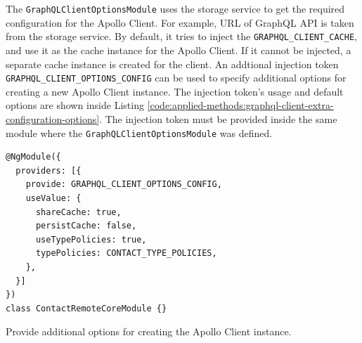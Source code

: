 \noindent The \texttt{GraphQLClientOptionsModule} uses the storage service to get the required configuration for the Apollo Client. For example, \ac{URL} of GraphQL \ac{API} is taken from the storage service. By default, it tries to inject the \texttt{GRAPHQL\_CLIENT\_CACHE}, and use it as the cache instance for the Apollo Client. If it cannot be injected, a separate cache instance is created for the client. An addtional injection token \texttt{GRAPHQL\_CLIENT\_OPTIONS\_CONFIG} can be used to specify additional options for creating a new Apollo Client instance. The injection token's usage and default options are shown inside Listing \ref{code:applied-methods:graphql-client-extra-configuration-options}. The injection token must be provided inside the same module where the \texttt{GraphQLClientOptionsModule} was defined.

\ifshowListings
\begin{listing}[H]
\begin{verbatim}
@NgModule({
  providers: [{
    provide: GRAPHQL_CLIENT_OPTIONS_CONFIG,
    useValue: {
      shareCache: true,
      persistCache: false,
      useTypePolicies: true,
      typePolicies: CONTACT_TYPE_POLICIES,
    },
  }]
})
class ContactRemoteCoreModule {}
\end{verbatim}
\caption{Provide additional options for creating the Apollo Client instance.}\label{code:applied-methods:graphql-client-extra-configuration-options}
\end{listing}
\fi

